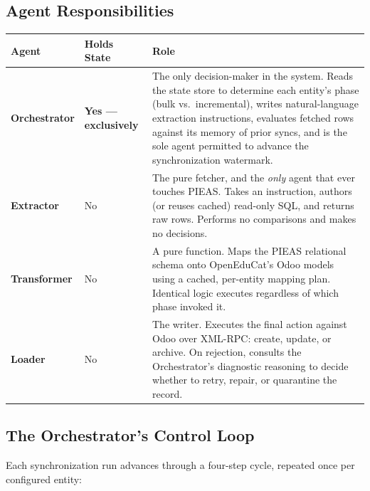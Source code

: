 \documentclass[11pt,a4paper]{article}
\begin{document}
\subsection{Agent Responsibilities}

\begin{longtable}{@{}>{\raggedright\arraybackslash}p{2.7cm}>{\raggedright\arraybackslash}p{2.1cm}>{\raggedright\arraybackslash}p{8.6cm}@{}}
\toprule
\rowcolor{navy!10}
\textbf{\color{navy}Agent} & \textbf{\color{navy}Holds State} & \textbf{\color{navy}Role} \\
\midrule
\endhead
\textbf{Orchestrator} & \color{teal!70!black}\bfseries Yes --- exclusively &
The only decision-maker in the system. Reads the state store to determine each entity's phase (bulk vs.\ incremental), writes natural-language extraction instructions, evaluates fetched rows against its memory of prior syncs, and is the sole agent permitted to advance the synchronization watermark. \\
\addlinespace
\textbf{Extractor} & No &
The pure fetcher, and the \emph{only} agent that ever touches PIEAS. Takes an instruction, authors (or reuses cached) read-only SQL, and returns raw rows. Performs no comparisons and makes no decisions. \\
\addlinespace
\textbf{Transformer} & No &
A pure function. Maps the PIEAS relational schema onto OpenEduCat's Odoo models using a cached, per-entity mapping plan. Identical logic executes regardless of which phase invoked it. \\
\addlinespace
\textbf{Loader} & No &
The writer. Executes the final action against Odoo over XML-RPC: create, update, or archive. On rejection, consults the Orchestrator's diagnostic reasoning to decide whether to retry, repair, or quarantine the record. \\
\bottomrule
\end{longtable}

\subsection{The Orchestrator's Control Loop}
Each synchronization run advances through a four-step cycle, repeated once per configured entity:
\end{document}
